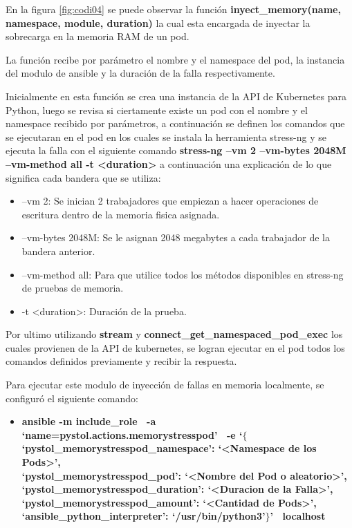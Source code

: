 \par En la figura \ref{fig:codi04} se puede observar la función \textbf{ inyect\_memory(name, namespace, module, duration)} la cual esta encargada de inyectar la sobrecarga en la memoria RAM de un pod.\\
\par La función recibe por parámetro el nombre y el namespace del pod, la instancia del modulo de ansible y la duración de la falla respectivamente. \\
\par Inicialmente en esta función se crea una instancia de la API de Kubernetes para Python, luego se revisa si ciertamente existe un pod con el nombre y el namespace recibido por parámetros, a continuación se definen los comandos que se ejecutaran en el pod en los cuales se instala la herramienta stress-ng y se ejecuta la falla con el siguiente comando
\textbf{stress-ng --vm 2 --vm-bytes 2048M --vm-method all -t <duration> } a continuación una explicación de lo que significa cada bandera que se utiliza:
\begin{itemize}
        \item --vm 2: Se inician 2 trabajadores que empiezan a hacer operaciones de escritura dentro de la memoria fisica asignada.        
        \item --vm-bytes 2048M: Se le asignan 2048 megabytes a cada trabajador de la bandera anterior.
        \item --vm-method all: Para que utilice todos los métodos disponibles en stress-ng de pruebas de memoria.
        \item -t <duration>: Duración de la prueba.\\
    \end{itemize}

\par Por ultimo utilizando \textbf{stream} y \textbf{connect\_get\_namespaced\_pod\_exec} los cuales provienen de la API de kubernetes, se logran ejecutar en el pod todos los comandos definidos previamente y recibir la respuesta.\\

\par Para ejecutar este modulo de inyección de fallas en memoria localmente, se configur\'o el siguiente comando:
\begin{itemize}
    \item \textbf{ansible -m include\_role \ -a `name=pystol.actions.memorystresspod' \ -e `$\{$ \\
    `pystol\_memorystresspod\_namespace': `<Namespace de los Pods>', \\
    `pystol\_memorystresspod\_pod': `<Nombre del Pod o aleatorio>', \\
    `pystol\_memorystresspod\_duration': `<Duracion de la Falla>', \\
    `pystol\_memorystresspod\_amount': `<Cantidad de Pods>', \\
    `ansible\_python\_interpreter': `/usr/bin/python3'$\}$' \ localhost} %
\end{itemize}



